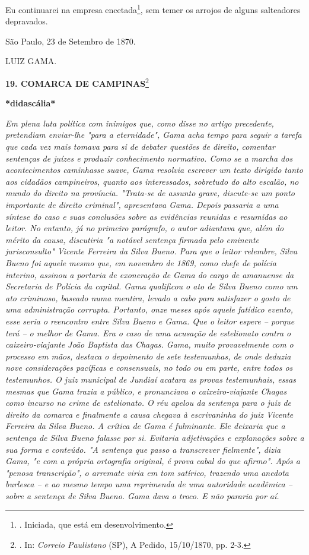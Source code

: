Eu continuarei na empresa encetada\footnote{. Iniciada, que está em
  desenvolvimento.}, sem temer os arrojos de alguns salteadores
depravados.

São Paulo, 23 de Setembro de 1870.

LUIZ GAMA.

\textbf{19. COMARCA DE CAMPINAS}\footnote{. In: \emph{Correio
  Paulistano} (SP), A Pedido, 15/10/1870, pp. 2-3.}

\textbf{*didascália*}

\emph{Em plena luta política com inimigos que, como disse no artigo
precedente, pretendiam enviar-lhe "para a eternidade", Gama acha tempo
para seguir a tarefa que cada vez mais tomava para si de debater
questões de direito, comentar sentenças de juízes e produzir
conhecimento normativo. Como se a marcha dos acontecimentos caminhasse
suave, Gama resolvia escrever um texto dirigido tanto aos cidadãos
campineiros, quanto aos interessados, sobretudo do alto escalão, no
mundo do direito na província. "Trata-se de assunto grave, discute-se um
ponto importante de direito criminal", apresentava Gama. Depois passaria
a uma síntese do caso e suas conclusões sobre as evidências reunidas e
resumidas ao leitor. No entanto, já no primeiro parágrafo, o autor
adiantava que, além do mérito da causa, discutiria "a notável sentença
firmada pelo eminente jurisconsulto" Vicente Ferreira da Silva Bueno.
Para que o leitor relembre, Silva Bueno foi aquele mesmo que, em
novembro de 1869, como chefe de polícia interino, assinou a portaria de
exoneração de Gama do cargo de amanuense da Secretaria de Polícia da
capital. Gama qualificou o ato de Silva Bueno como um ato criminoso,
baseado numa mentira, levado a cabo para satisfazer o gosto de uma
administração corrupta. Portanto, onze meses após aquele fatídico
evento, esse seria o reencontro entre Silva Bueno e Gama. Que o leitor
espere -- porque terá -- o melhor de Gama. Era o caso de uma acusação de
estelionato contra o caixeiro-viajante João Baptista das Chagas. Gama,
muito provavelmente com o processo em mãos, destaca o depoimento de sete
testemunhas, de onde deduzia nove considerações pacíficas e consensuais,
no todo ou em parte, entre todos os testemunhos. O juiz municipal de
Jundiaí acatara as provas testemunhais, essas mesmas que Gama trazia a
público, e pronunciava o caixeiro-viajante Chagas como incurso no crime
de estelionato. O réu apelou da sentença para o juiz de direito da
comarca e finalmente a causa chegava à escrivaninha do juiz Vicente
Ferreira da Silva Bueno. A crítica de Gama é fulminante. Ele deixaria
que a sentença de Silva Bueno falasse por si. Evitaria adjetivações e
explanações sobre a sua forma e conteúdo. "A sentença que passo a
transcrever fielmente", dizia Gama, "e com a própria ortografia
original, é prova cabal do que afirmo". Após a "penosa transcrição", o
arremate viria em tom satírico, trazendo uma anedota burlesca -- e ao
mesmo tempo uma reprimenda de uma autoridade acadêmica -- sobre a
sentença de Silva Bueno. Gama dava o troco. E não pararia por aí. }

